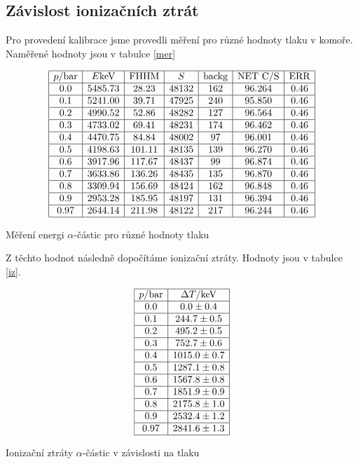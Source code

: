 \documentclass[a4paper,12pt]{article}
\begin{document}
\subsection{Závislost ionizačních ztrát}
Pro provedení kalibrace jsme provedli měření pro různé hodnoty tlaku v komoře. Naměřené hodnoty 
jsou v tabulce \ref{mer}

\begin{table}
$$
\begin{array}{|c|c|c|c|c|c|c|}
\hline
p/\mbox{bar}&E\mbox{keV}&\mbox{FHHM}&S&\mbox{backg}&\mbox{NET C/S}& \mbox{ERR}\\ \hline
0.0&5485.73&28.23&48132&162&96.264&0.46\\ \hline
0.1&5241.00&39.71&47925&240&95.850&0.46\\ \hline
0.2&4990.52&52.86&48282&127&96.564&0.46\\ \hline
0.3&4733.02&69.41&48231&174&96.462&0.46\\ \hline
0.4&4470.75&84.84&48002&97&96.001&0.46\\ \hline
0.5&4198.63&101.11&48135&139&96.270&0.46\\ \hline
0.6&3917.96&117.67&48437&99&96.874&0.46\\ \hline
0.7&3633.86&136.26&48435&135&96.870&0.46\\ \hline
0.8&3309.94&156.69&48424&162&96.848&0.46\\ \hline
0.9&2953.28&185.95&48197&131&96.394&0.46\\ \hline
0.97&2644.14&211.98&48122&217&96.244&0.46\\ \hline
\end{array}
$$
\caption{Měření energi $\alpha$-částic pro různé hodnoty tlaku}
\label{mer}
\end{table}
Z těchto hodnot následně dopočítáme ionizační ztráty. Hodnoty jsou v tabulce \ref{iz}.

\begin{table}
$$
\begin{array}{|c|c|}
\hline
p/\mbox{bar}& \Delta T/\mbox{keV} \\ \hline
0.0&0.0\pm0.4\\ \hline
0.1&244.7\pm0.5\\ \hline
0.2&495.2\pm0.5\\ \hline
0.3&752.7\pm0.6\\ \hline
0.4&1015.0\pm0.7\\ \hline
0.5&1287.1\pm0.8\\ \hline
0.6&1567.8\pm0.8\\ \hline
0.7&1851.9\pm0.9\\ \hline
0.8&2175.8\pm1.0\\ \hline
0.9&2532.4\pm1.2\\ \hline
0.97&2841.6\pm1.3\\ \hline
\end{array}
$$
\caption{Ionizační ztráty $\alpha$-částic v závislosti na tlaku}
\label{iz}
\end{table}
\end{document}
